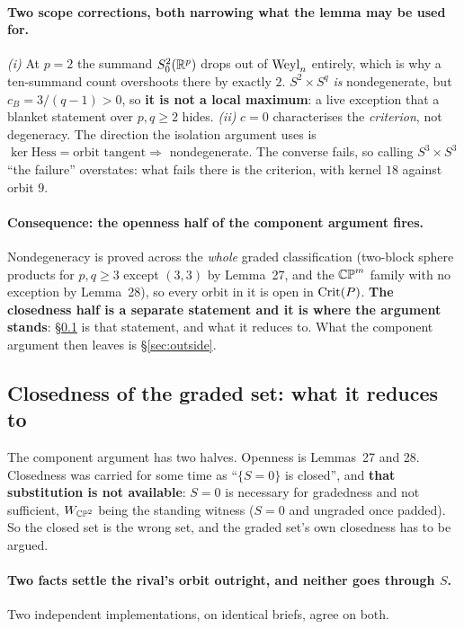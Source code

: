 \paragraph{Two scope corrections, both narrowing what the lemma may be used for.} \emph{(i)} At $p=2$ the summand $S^2_0(\mathbb{R}^p)$ drops out of $\mathrm{Weyl}_n$ entirely, which is why a ten-summand count overshoots there by exactly $2$. $S^2\times S^q$ \emph{is} nondegenerate, but $c_B=3/(q-1)>0$, so \textbf{it is not a local maximum}: a live exception that a blanket statement over $p,q\ge2$ hides. \emph{(ii)} $c=0$ characterises the \emph{criterion}, not degeneracy. The direction the isolation argument uses is $\ker\mathrm{Hess}=\text{orbit tangent}\Rightarrow$ nondegenerate. The converse fails, so calling $S^3\times S^3$ ``the failure'' overstates: what fails there is the criterion, with kernel $18$ against orbit $9$.

\paragraph{Consequence: the openness half of the component argument fires.} Nondegeneracy is proved across the \emph{whole} graded classification (two-block sphere products for $p,q\ge3$ except $(3,3)$ by Lemma~27, and the $\mathbb{CP}^m$ family with no exception by Lemma~28), so every orbit in it is open in $\mathrm{Crit}(P)$. \textbf{The closedness half is a separate statement and it is where the argument stands}: \S\ref{sec:closedness} is that statement, and what it reduces to. What the component argument then leaves is \S\ref{sec:outside}.

\subsection{Closedness of the graded set: what it reduces to}\label{sec:closedness}

The component argument has two halves. Openness is Lemmas~27 and 28. Closedness was carried for some time as ``$\{S=0\}$ is closed'', and \textbf{that substitution is not available}: $S=0$ is necessary for gradedness and not sufficient, $W_{\mathbb{CP}^2}$ being the standing witness ($S=0$ and ungraded once padded). So the closed set is the wrong set, and the graded set's own closedness has to be argued.

\paragraph{Two facts settle the rival's orbit outright, and neither goes through $S$.} Two independent implementations, on identical briefs, agree on both.

